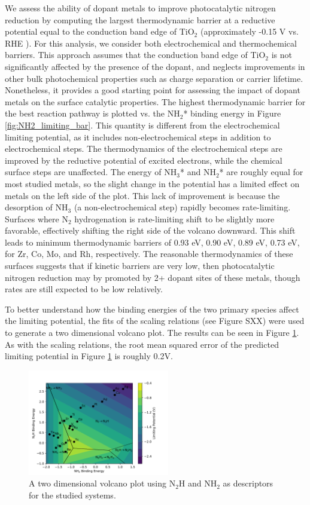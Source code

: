 We assess the ability of dopant metals to improve photocatalytic nitrogen reduction by computing the largest thermodynamic barrier at a reductive potential equal to the conduction band edge of TiO$_2$ (approximately -0.15 V vs. RHE \cite{Nozik_1996}). For this analysis, we consider both electrochemical and thermochemical barriers. This approach assumes that the conduction band edge of TiO$_2$ is not significantly affected by the presence of the dopant, and neglects improvements in other bulk photochemical properties such as charge separation or carrier lifetime. Nonetheless, it provides a good starting point for assessing the impact of dopant metals on the surface catalytic properties.
The highest thermodynamic barrier for the best reaction pathway is plotted vs. the NH$_2$* binding energy in Figure \ref{fig:NH2_limiting_bar}. This quantity is different from the electrochemical limiting potential, as it includes non-electrochemical steps in addition to electrochemical steps. The thermodynamics of the electrochemical steps are improved by the reductive potential of excited electrons, while the chemical surface steps are unaffected. The energy of NH$_3$* and  NH$_2$* are roughly equal for most studied metals, so the slight change in the potential has a limited effect on metals on the left side of the plot. This lack of improvement is because the desorption of NH$_3$ (a non-electrochemical step) rapidly becomes rate-limiting. Surfaces where N$_2$ hydrogenation is rate-limiting shift to be slightly more favorable, effectively shifting the right side of the volcano downward. This shift leads to minimum thermodynamic barriers of 0.93 eV, 0.90 eV, 0.89 eV, 0.73 eV, for Zr, Co, Mo, and  Rh, respectively. The reasonable thermodynamics of these surfaces suggests that if kinetic barriers are very low, then photocatalytic nitrogen reduction may by promoted by 2+ dopant sites of these metals, though rates are still expected to be low relatively.

To better understand how the binding energies of the two primary species affect the limiting potential, the fits of the scaling relations (see Figure SXX) were used to generate a two dimensional volcano plot. The results can be seen in Figure \ref{fig:2d_plot}. As with the scaling relations, the root mean squared error of the predicted limiting potential in Figure \ref{fig:2d_plot} is roughly 0.2V.


\begin{figure}
    \centering
    \includegraphics[width=0.55\textwidth]{Images/2d_scaling_plot.pdf}
    \caption{A two dimensional volcano plot using N$_2$H and NH$_2$ as descriptors for the studied systems.}
    \label{fig:2d_plot}
\end{figure}

